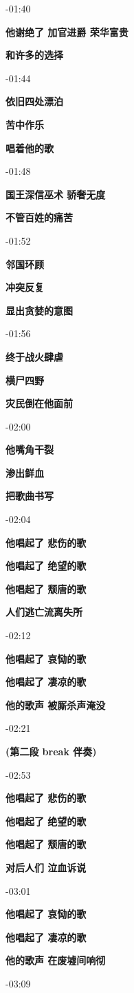 \documentclass[a4paper]{article}
\begin{document}
-01:40

\textbf{他谢绝了 加官进爵 荣华富贵}

\textbf{和许多的选择}

-01:44

\textbf{依旧四处漂泊}

\textbf{苦中作乐}

\textbf{唱着他的歌}

-01:48

\textbf{国王深信巫术 骄奢无度}

\textbf{不管百姓的痛苦}

-01:52

\textbf{邻国环顾}

\textbf{冲突反复}

\textbf{显出贪婪的意图}

-01:56

\textbf{终于战火肆虐}

\textbf{横尸四野}

\textbf{灾民倒在他面前}

-02:00

\textbf{他嘴角干裂}

\textbf{渗出鲜血}

\textbf{把歌曲书写}

-02:04

\textbf{他唱起了 悲伤的歌}

\textbf{他唱起了 绝望的歌}

\textbf{他唱起了 颓唐的歌}

\textbf{人们逃亡流离失所}

-02:12

\textbf{他唱起了 哀恸的歌}

\textbf{他唱起了 凄凉的歌}

\textbf{他的歌声 被厮杀声淹没}

-02:21

\textbf{(第二段 break 伴奏)}

-02:53

\textbf{他唱起了 悲伤的歌}

\textbf{他唱起了 绝望的歌}

\textbf{他唱起了 颓唐的歌}

\textbf{对后人们 泣血诉说}

-03:01

\textbf{他唱起了 哀恸的歌}

\textbf{他唱起了 凄凉的歌}

\textbf{他的歌声 在废墟间响彻}

-03:09
\end{document}

